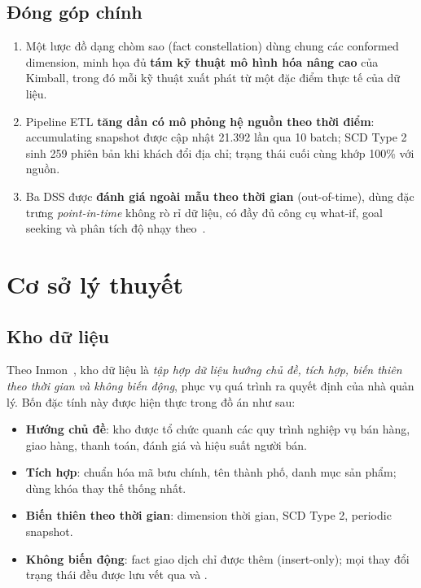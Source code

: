\documentclass[a4paper]{article}
\DeclareRobustCommand{\code}[1]{\texttt{\detokenize{#1}}}
\begin{document}
\subsection{Đóng góp chính}
\begin{enumerate}
    \item Một lược đồ dạng chòm sao (fact constellation) dùng chung các conformed dimension, minh họa đủ \textbf{tám kỹ thuật mô hình hóa nâng cao} của Kimball, trong đó mỗi kỹ thuật xuất phát từ một đặc điểm thực tế của dữ liệu.
    \item Pipeline ETL \textbf{tăng dần có mô phỏng hệ nguồn theo thời điểm}: accumulating snapshot được cập nhật 21.392 lần qua 10 batch; SCD Type 2 sinh 259 phiên bản khi khách đổi địa chỉ; trạng thái cuối cùng khớp 100\% với nguồn.
    \item Ba DSS được \textbf{đánh giá ngoài mẫu theo thời gian} (out-of-time), dùng đặc trưng \textit{point-in-time} không rò rỉ dữ liệu, có đầy đủ công cụ what-if, goal seeking và phân tích độ nhạy theo~\cite{turban2005}.
\end{enumerate}

\section{Cơ sở lý thuyết}

\subsection{Kho dữ liệu}
Theo Inmon~\cite{inmon2005}, kho dữ liệu là \textit{tập hợp dữ liệu hướng chủ đề, tích hợp, biến thiên theo thời gian và không biến động}, phục vụ quá trình ra quyết định của nhà quản lý. Bốn đặc tính này được hiện thực trong đồ án như sau:
\begin{itemize}
    \item \textbf{Hướng chủ đề}: kho được tổ chức quanh các quy trình nghiệp vụ bán hàng, giao hàng, thanh toán, đánh giá và hiệu suất người bán.
    \item \textbf{Tích hợp}: chuẩn hóa mã bưu chính, tên thành phố, danh mục sản phẩm; dùng khóa thay thế thống nhất.
    \item \textbf{Biến thiên theo thời gian}: dimension thời gian, SCD Type 2, periodic snapshot.
    \item \textbf{Không biến động}: fact giao dịch chỉ được thêm (insert-only); mọi thay đổi trạng thái đều được lưu vết qua \code{update_count} và \code{batch_id}.
\end{itemize}
\end{document}
